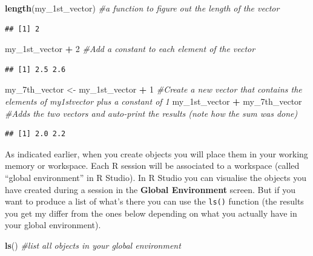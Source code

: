 \documentclass[]{book}
\newenvironment{Shaded}{\begin{snugshade}}{\end{snugshade}}
\newcommand{\CommentTok}[1]{\textcolor[rgb]{0.56,0.35,0.01}{\textit{#1}}}
\newcommand{\DecValTok}[1]{\textcolor[rgb]{0.00,0.00,0.81}{#1}}
\newcommand{\KeywordTok}[1]{\textcolor[rgb]{0.13,0.29,0.53}{\textbf{#1}}}
\newcommand{\NormalTok}[1]{#1}
\newcommand{\OperatorTok}[1]{\textcolor[rgb]{0.81,0.36,0.00}{\textbf{#1}}}
\newcommand{\StringTok}[1]{\textcolor[rgb]{0.31,0.60,0.02}{#1}}
\begin{document}
\begin{Shaded}
\begin{Highlighting}[]
\KeywordTok{length}\NormalTok{(my_1st_vector) }\CommentTok{#a function to figure out the length of the vector}
\end{Highlighting}
\end{Shaded}

\begin{verbatim}
## [1] 2
\end{verbatim}

\begin{Shaded}
\begin{Highlighting}[]
\NormalTok{my_1st_vector }\OperatorTok{+}\StringTok{ }\DecValTok{2} \CommentTok{#Add a constant to each element of the vector}
\end{Highlighting}
\end{Shaded}

\begin{verbatim}
## [1] 2.5 2.6
\end{verbatim}

\begin{Shaded}
\begin{Highlighting}[]
\NormalTok{my_7th_vector <-}\StringTok{ }\NormalTok{my_1st_vector }\OperatorTok{+}\StringTok{ }\DecValTok{1} \CommentTok{#Create a new vector that contains the elements of my1stvector plus a constant of 1}
\NormalTok{my_1st_vector }\OperatorTok{+}\StringTok{ }\NormalTok{my_7th_vector }\CommentTok{#Adds the two vectors and auto-print the results (note how the sum was done)}
\end{Highlighting}
\end{Shaded}

\begin{verbatim}
## [1] 2.0 2.2
\end{verbatim}

As indicated earlier, when you create objects you will place them in your working memory or workspace. Each R session will be associated to a workspace (called ``global environment'' in R Studio). In R Studio you can visualise the objects you have created during a session in the \textbf{Global Environment} screen. But if you want to produce a list of what's there you can use the \texttt{ls()} function (the results you get my differ from the ones below depending on what you actually have in your global environment).

\begin{Shaded}
\begin{Highlighting}[]
\KeywordTok{ls}\NormalTok{() }\CommentTok{#list all objects in your global environment}
\end{Highlighting}
\end{Shaded}
\end{document}
